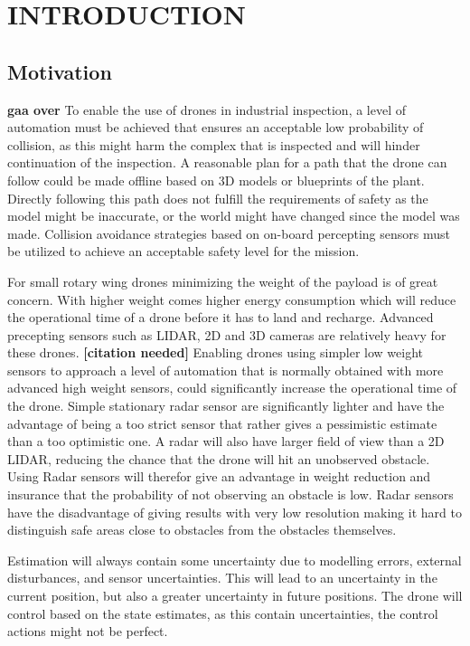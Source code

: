 \section{INTRODUCTION}
\subsection{Motivation}
\textbf{gaa over}
To enable the use of drones in industrial inspection, a level of automation must be achieved that ensures an acceptable low probability of collision, as this might harm the complex that is inspected and will hinder continuation of the inspection. A reasonable plan for a path that the drone can follow could be made offline based on 3D models or blueprints of the plant. Directly following this path does not fulfill the requirements of safety as the model might be inaccurate, or the world might have changed since the model was made. Collision avoidance strategies based on on-board percepting sensors must be utilized to achieve an acceptable safety level for the mission.

For small rotary wing drones minimizing the weight of the payload is of great concern. With higher weight comes higher energy consumption which will reduce the operational time of a drone before it has to land and recharge. Advanced precepting sensors such as LIDAR, 2D and 3D cameras are relatively heavy for these drones. \textbf{[citation needed]} Enabling drones using simpler low weight sensors to approach a level of automation that is normally obtained with more advanced high weight sensors, could significantly increase the operational time of the drone. Simple stationary radar sensor are significantly lighter and have the advantage of being a too strict sensor that rather gives a pessimistic estimate than a too optimistic one. A radar will also have larger field of view than a 2D LIDAR, reducing the chance that the drone will hit an unobserved obstacle. Using Radar sensors will therefor give an advantage in weight reduction and insurance that the probability of not observing an obstacle is low. Radar sensors have the disadvantage of giving results with very low resolution making it hard to distinguish safe areas close to obstacles from the obstacles themselves. 

Estimation will always contain some uncertainty due to modelling errors, external disturbances, and sensor uncertainties. This will lead to an uncertainty in the current position, but also a greater uncertainty in future positions. The drone will control based on the state estimates, as this contain uncertainties, the control actions might not be perfect.


